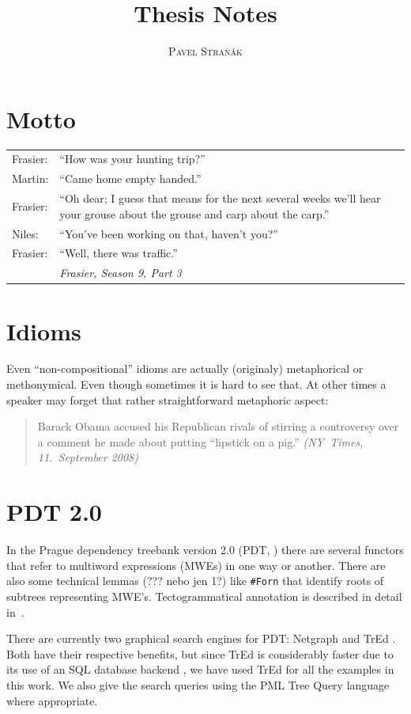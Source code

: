 \documentclass[11pt, a4paper]{article}
\title{Thesis Notes}
\author{\textsc{Pavel Straňák}}
\begin{document}
\maketitle

\section*{Motto}
\begin{tabular}{@{} lp{11cm} @{}} %
Frasier: & ``How was your hunting trip?''\\
Martin: & ``Came home empty handed.''\\
Frasier: & ``Oh dear; I guess that means for the next several weeks we'll hear your grouse about the grouse and carp about the carp.''\\
Niles: & ``You've been working on that, haven't you?''\\
Frasier: & ``Well, there was traffic.''\\
 & \raggedleft\emph{Frasier, Season 9, Part 3}\\
\end{tabular}

\section*{Idioms}
Even ``non-compositional'' idioms are actually (originaly) metaphorical or methonymical.  Even though sometimes it is hard to see that. At other times a speaker may forget that rather straightforward metaphoric aspect:

\begin{quote}
Barack Obama accused his Republican rivals of stirring a controversy over a comment he made about putting “lipstick on a pig.” \emph{(NY~Times, 11.~September 2008)}
\end{quote}


\section{PDT 2.0}\label{PDT}
In the Prague dependency treebank version 2.0 (PDT, ) there are several functors that refer to multiword expressions (MWEs) in one way or another. There are also some technical lemmas (??? nebo jen 1?) like {\tt \#Forn} that identify roots of subtrees representing MWE's. Tectogrammatical annotation is described in detail in~\citet{mikulova:2006}.

There are currently two graphical search engines for PDT: Netgraph \cite{netgraph} and TrEd \cite{tred}. Both have their respective benefits, but since TrEd is considerably faster due to its use of an SQL database backend \cite{pmltq}, we have used TrEd for all the examples in this work. We also give the search queries using the PML Tree Query language \cite{pmltq} where appropriate.
\end{document}
